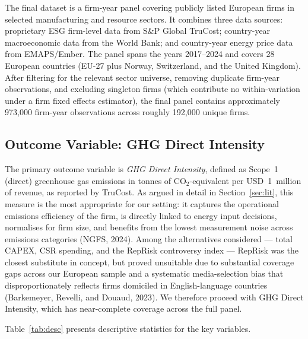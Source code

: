 \documentclass[authoryear,preprint,review,12pt]{elsarticle}
\begin{document}
The final dataset is a firm-year panel covering publicly listed European firms in selected manufacturing and resource sectors. It combines three data sources: proprietary ESG firm-level data from S\&P Global TruCost; country-year macroeconomic data from the World Bank; and country-year energy price data from EMAPS/Ember. The panel spans the years 2017--2024 and covers 28 European countries (EU-27 plus Norway, Switzerland, and the United Kingdom). After filtering for the relevant sector universe, removing duplicate firm-year observations, and excluding singleton firms (which contribute no within-variation under a firm fixed effects estimator), the final panel contains approximately 973,000 firm-year observations across roughly 192,000 unique firms.

\subsection{Outcome Variable: GHG Direct Intensity}

The primary outcome variable is \textit{GHG Direct Intensity}, defined as Scope~1 (direct) greenhouse gas emissions in tonnes of CO$_2$-equivalent per USD~1~million of revenue, as reported by TruCost. As argued in detail in Section~\ref{sec:lit}, this measure is the most appropriate for our setting: it captures the operational emissions efficiency of the firm, is directly linked to energy input decisions, normalises for firm size, and benefits from the lowest measurement noise across emissions categories (NGFS, 2024). Among the alternatives considered --- total CAPEX, CSR spending, and the RepRisk controversy index --- RepRisk was the closest substitute in concept, but proved unsuitable due to substantial coverage gaps across our European sample and a systematic media-selection bias that disproportionately reflects firms domiciled in English-language countries (Barkemeyer, Revelli, and Douaud, 2023). We therefore proceed with GHG Direct Intensity, which has near-complete coverage across the full panel.

Table~\ref{tab:desc} presents descriptive statistics for the key variables.
\end{document}
